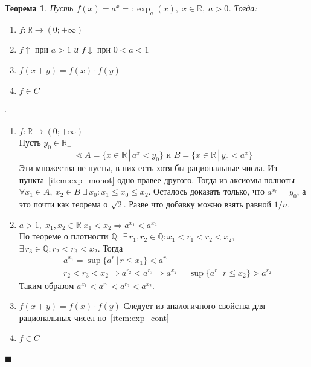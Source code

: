 \documentclass[a4paper,12pt]{article}
\newcommand\R{\mathbb{R}}
\newcommand\Q{\mathbb{Q}}
\theoremstyle{plain}
\newtheorem{thrm}{Теорема}
\theoremstyle{definition}
\theoremstyle{remark}
\newenvironment{ittproof}{$\square$ }{ $\blacksquare$ \\}
\begin{document}
\begin{enumerate}
      \begin{thrm}\label{thrm:exponent}
        Пусть $f(x) = a^x =: \exp_a(x),\;x\in\R,\;a>0$.
        Тогда:
        \begin{enumerate}
          \item $f:\R\to(0;+\infty)$
          \item $f \uparrow \text{ при }a > 1$ и $f\downarrow \text{ при } 0 < a < 1$
          \item $f(x+y) = f(x)\cdot f(y)$
          \item $f\in C$
        \end{enumerate}
      \end{thrm}
      \begin{ittproof}
        \begin{enumerate}
          \item\label{item:exp_values} $f:\R\to(0;+\infty)$ \\
            Пусть $y_0\in\R_+$
            \[
              \sphericalangle\; A=\{x\in\R\,|\,a^x < y_0\} \text{ и } 
              B = \{x\in\R\,|\,y_0 < a^x\}
            \]
            Эти множества не пусты, в них есть хотя бы рациональные числа.
            Из пункта~\ref{item:exp_monot} одно правее другого. 
            Тогда из аксиомы полноты 
            $\forall x_1\in A,\: x_2\in B \; \exists\, x_0: x_1\leq x_0\leq x_2$.
            Осталось доказать только, что $a^{x_0} = y_0$, а это почти как теорема о $\sqrt{2}$.
            Разве что добавку можно взять равной $1/n$.
          \item\label{item:exp_monot} 
            $a > 1,\; x_1,x_2\in\R \; x_1 < x_2\Rightarrow a^{x_1} < a^{x_2} $ \\
            По теореме о плотности $\Q : \; \exists\,r_1,r_2\in\Q : x_1<r_1<r_2<x_2$,
            $\exists\, r_3\in\Q : r_2 < r_3 < x_2$.
            Тогда 
            \begin{align*}
              &a^{x_1} = \sup\{a^r\,|\,r\leq x_1\} < a^{r_1} \\
              &r_2 < r_3 < x_2 \Rightarrow a^{r_2} < a^{r_3} \Rightarrow 
              a^{x_2} = \sup\{a^r\,|\,r\leq x_2\} > a^{r_2} 
            \end{align*}
            Таким образом $a^{x_1} < a^{r_1} < a^{r_2} < a^{x_2}$.
          \item\label{item:exp_oper} $f(x+y) = f(x)\cdot f(y)$
            Следует из аналогичного свойства для рациональных чисел по~\ref{item:exp_cont}
          \item\label{item:exp_cont} $f\in C$

\end{enumerate}
\end{ittproof}
\end{enumerate}
\end{document}

